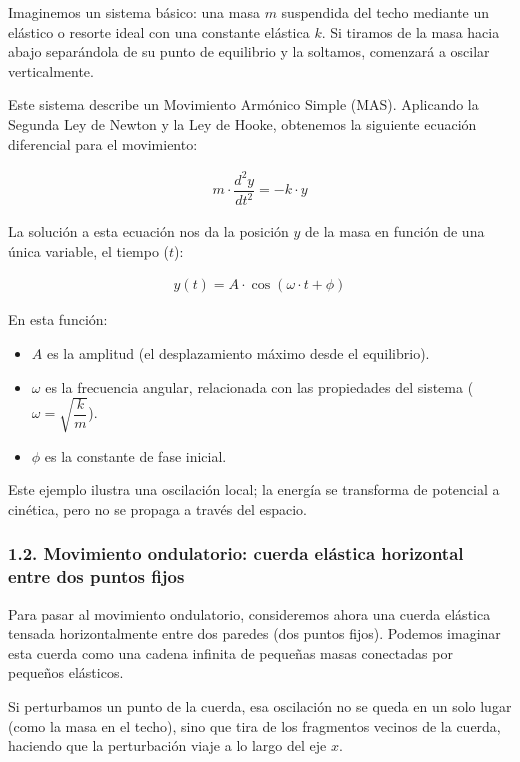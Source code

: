 \documentclass[
  spanish,
]{article}
\providecommand{\tightlist}{%
  \setlength{\itemsep}{0pt}\setlength{\parskip}{0pt}}
\begin{document}
Imaginemos un sistema básico: una masa \(m\) suspendida del techo
mediante un elástico o resorte ideal con una constante elástica \(k\).
Si tiramos de la masa hacia abajo separándola de su punto de equilibrio
y la soltamos, comenzará a oscilar verticalmente.

Este sistema describe un Movimiento Armónico Simple (MAS). Aplicando la
Segunda Ley de Newton y la Ley de Hooke, obtenemos la siguiente ecuación
diferencial para el movimiento:

\[
\begin{aligned}
m \cdot \dfrac{d^2y}{dt^2} = -k \cdot y
\end{aligned}
\]

La solución a esta ecuación nos da la posición \(y\) de la masa en
función de una única variable, el tiempo (\(t\)):

\[
\begin{aligned}
y(t) = A \cdot \cos(\omega \cdot t + \phi)
\end{aligned}
\]

En esta función:

\begin{itemize}
\tightlist
\item
  \(A\) es la amplitud (el desplazamiento máximo desde el equilibrio).
\item
  \(\omega\) es la frecuencia angular, relacionada con las propiedades
  del sistema (\(\omega = \sqrt{\dfrac{k}{m}}\)).
\item
  \(\phi\) es la constante de fase inicial.
\end{itemize}

Este ejemplo ilustra una oscilación local; la energía se transforma de
potencial a cinética, pero no se propaga a través del espacio.

\subsubsection{1.2. Movimiento ondulatorio: cuerda elástica horizontal
entre dos puntos
fijos}\label{movimiento-ondulatorio-cuerda-eluxe1stica-horizontal-entre-dos-puntos-fijos}

Para pasar al movimiento ondulatorio, consideremos ahora una cuerda
elástica tensada horizontalmente entre dos paredes (dos puntos fijos).
Podemos imaginar esta cuerda como una cadena infinita de pequeñas masas
conectadas por pequeños elásticos.

Si perturbamos un punto de la cuerda, esa oscilación no se queda en un
solo lugar (como la masa en el techo), sino que tira de los fragmentos
vecinos de la cuerda, haciendo que la perturbación viaje a lo largo del
eje \(x\).
\end{document}
